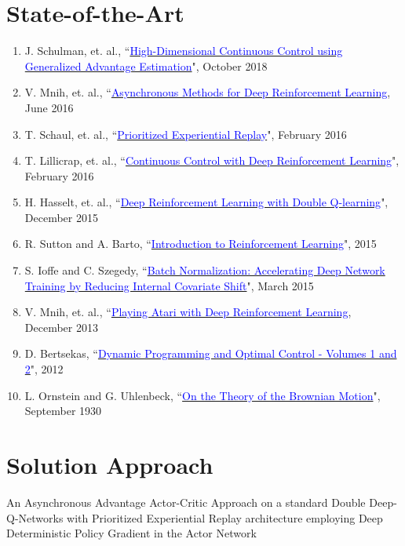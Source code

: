 \documentclass{article}
\begin{document}
\section{State-of-the-Art}
\begin{enumerate}
    \item J. Schulman, et. al., ``\href{https://arxiv.org/pdf/1506.02438.pdf}{\textcolor{blue}{High-Dimensional Continuous Control using Generalized Advantage Estimation}}", October 2018\label{1}
    \item V. Mnih, et. al.,
    ``\href{https://arxiv.org/pdf/1602.01783.pdf}{\textcolor{blue}{Asynchronous Methods for Deep Reinforcement Learning}}, June 2016\label{2}
    \item T. Schaul, et. al., ``\href{https://arxiv.org/pdf/1511.05952.pdf}{\textcolor{blue}{Prioritized Experiential Replay}}", February 2016\label{3}
    \item T. Lillicrap, et. al., ``\href{https://arxiv.org/pdf/1509.02971.pdf}{\textcolor{blue}{Continuous Control with Deep Reinforcement Learning}}", February 2016\label{4}
    \item H. Hasselt, et. al.,
    ``\href{https://arxiv.org/pdf/1509.06461.pdf}{\textcolor{blue}{Deep Reinforcement Learning with Double Q-learning}}", December 2015\label{5}
    \item R. Sutton and A. Barto,
    ``\href{https://web.stanford.edu/class/psych209/Readings/SuttonBartoIPRLBook2ndEd.pdf}{\textcolor{blue}{Introduction to Reinforcement Learning}}", 2015\label{6}
    \item S. Ioffe and C. Szegedy,
    ``\href{https://arxiv.org/pdf/1502.03167.pdf}{\textcolor{blue}{Batch Normalization: Accelerating Deep Network Training by Reducing Internal Covariate Shift}}", March 2015\label{7}
    \item V. Mnih, et. al.,
    ``\href{https://arxiv.org/pdf/1312.5602.pdf}{\textcolor{blue}{Playing Atari with Deep Reinforcement Learning}}, December 2013\label{8}
    \item D. Bertsekas, ``\href{http://web.mit.edu/dimitrib/www/dpchapter.html}{\textcolor{blue}{Dynamic Programming and Optimal Control - Volumes 1 and 2}}", 2012\label{9}
    \item L. Ornstein and G. Uhlenbeck,
    ``\href{https://journals.aps.org/pr/abstract/10.1103/PhysRev.36.823}{\textcolor{blue}{On the Theory of the Brownian Motion}}", September 1930\label{10}
\end{enumerate}
\section{Solution Approach}
An Asynchronous Advantage Actor-Critic Approach on a standard Double Deep-Q-Networks with Prioritized Experiential Replay architecture employing Deep Deterministic Policy Gradient in the Actor Network
\end{document}
